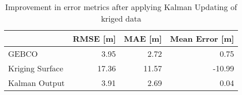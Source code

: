 \begin{table}
\centering
\caption{Improvement in error metrics after applying Kalman Updating of kriged data}
\label{tab:oahu4_gebco_raster_error}
\begin{tabular}{lrrr}
\toprule
 & RMSE [m] & MAE [m] & Mean Error [m] \\
\midrule
GEBCO & 3.95 & 2.72 & 0.75 \\
Kriging Surface & 17.36 & 11.57 & -10.99 \\
Kalman Output & 3.91 & 2.69 & 0.04 \\
\bottomrule
\end{tabular}
\end{table}
